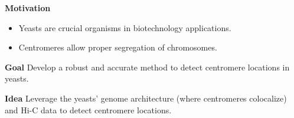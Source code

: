 \documentclass[xcolor=dvipsnames]{beamer}
\begin{document}
\begin{frame}
{}

{\color{Blue} \textbf{Motivation}}
\begin{itemize}
\item Yeasts are crucial organisms in biotechnology applications.
\item Centromeres allow proper segregation of chromosomes.
\end{itemize}

\vspace{1em}
{\color{Blue} \textbf{Goal}} Develop a robust and accurate method to detect
centromere locations in yeasts.

\vspace{1em}
{\color{Blue} \textbf{Idea}} Leverage the yeasts' genome architecture (where
centromeres colocalize) and Hi-C
data to detect centromere locations.
\end{frame}
\end{document}
